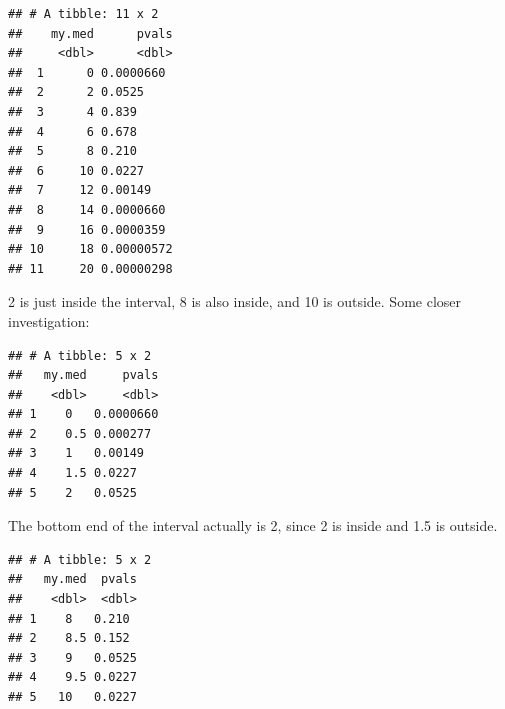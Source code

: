 \documentclass[]{tufte-book}
\newenvironment{Shaded}{}{}
\newcommand{\DataTypeTok}[1]{\textcolor[rgb]{0.56,0.13,0.00}{#1}}
\newcommand{\DecValTok}[1]{\textcolor[rgb]{0.25,0.63,0.44}{#1}}
\newcommand{\FloatTok}[1]{\textcolor[rgb]{0.25,0.63,0.44}{#1}}
\newcommand{\KeywordTok}[1]{\textcolor[rgb]{0.00,0.44,0.13}{\textbf{#1}}}
\newcommand{\NormalTok}[1]{#1}
\newcommand{\OperatorTok}[1]{\textcolor[rgb]{0.40,0.40,0.40}{#1}}
\newcommand{\StringTok}[1]{\textcolor[rgb]{0.25,0.44,0.63}{#1}}
\theoremstyle{definition}
\theoremstyle{definition}
\theoremstyle{definition}
\theoremstyle{remark}
\begin{document}
\begin{verbatim}
## # A tibble: 11 x 2
##    my.med      pvals
##     <dbl>      <dbl>
##  1      0 0.0000660 
##  2      2 0.0525    
##  3      4 0.839     
##  4      6 0.678     
##  5      8 0.210     
##  6     10 0.0227    
##  7     12 0.00149   
##  8     14 0.0000660 
##  9     16 0.0000359 
## 10     18 0.00000572
## 11     20 0.00000298
\end{verbatim}

2 is just inside the interval, 8 is also inside, and 10 is outside. Some
closer investigation:

\begin{Shaded}
\end{Shaded}

\begin{verbatim}
## # A tibble: 5 x 2
##   my.med     pvals
##    <dbl>     <dbl>
## 1    0   0.0000660
## 2    0.5 0.000277 
## 3    1   0.00149  
## 4    1.5 0.0227   
## 5    2   0.0525
\end{verbatim}

The bottom end of the interval actually is 2, since 2 is inside and 1.5
is outside.

\begin{Shaded}
\end{Shaded}

\begin{verbatim}
## # A tibble: 5 x 2
##   my.med  pvals
##    <dbl>  <dbl>
## 1    8   0.210 
## 2    8.5 0.152 
## 3    9   0.0525
## 4    9.5 0.0227
## 5   10   0.0227
\end{verbatim}
\end{document}

